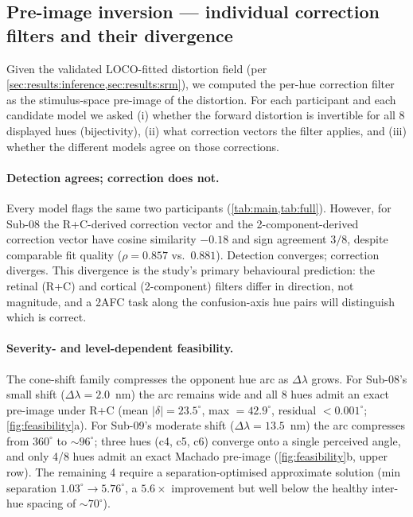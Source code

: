 \subsection{Pre-image inversion --- individual correction filters and
their divergence}
\label{sec:results:filter}

Given the validated LOCO-fitted distortion field (per
\cref{sec:results:inference,sec:results:srm}), we computed the
per-hue correction filter as the stimulus-space pre-image of the
distortion. For each participant and each candidate model we asked
(i) whether the forward distortion is invertible for all 8 displayed
hues (bijectivity), (ii) what correction vectors the filter applies,
and (iii) whether the different models agree on those corrections.

\paragraph{Detection agrees; correction does not.}
Every model flags the same two participants
(\cref{tab:main,tab:full}). However, for Sub-08 the R+C-derived
correction vector and the 2-component-derived correction vector have
cosine similarity $-0.18$ and sign agreement $3/8$, despite comparable
fit quality ($\rho = 0.857$ vs.\ $0.881$). Detection converges;
correction diverges. This divergence is the study's primary
behavioural prediction: the retinal (R+C) and cortical (2-component)
filters differ in direction, not magnitude, and a 2AFC task along
the confusion-axis hue pairs will distinguish which is correct.

\paragraph{Severity- and level-dependent feasibility.}
The cone-shift family compresses the opponent hue arc as $\Delta\lambda$
grows. For Sub-08's small shift ($\Delta\lambda = 2.0$~nm) the arc
remains wide and all 8 hues admit an exact pre-image under R+C (mean
$|\delta| = 23.5^\circ$, max $= 42.9^\circ$, residual $< 0.001^\circ$;
\cref{fig:feasibility}a). For Sub-09's moderate shift
($\Delta\lambda = 13.5$~nm) the arc compresses from $360^\circ$ to
$\sim 96^\circ$; three hues (c4, c5, c6) converge onto a single
perceived angle, and only 4/8 hues admit an exact Machado pre-image
(\cref{fig:feasibility}b, upper row). The remaining 4 require a
separation-optimised approximate solution (min separation
$1.03^\circ \to 5.76^\circ$, a $5.6\times$ improvement but well below
the healthy inter-hue spacing of $\sim 70^\circ$).

